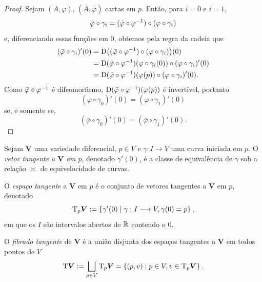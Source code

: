 \begin{proof}
Sejam $(A,\varphi)$, $(\bar A,\bar \varphi)$ cartas em $p$. Então, para $i=0$ e $i=1$,
	\begin{equation*}
	\bar\varphi \circ \gamma_i = (\bar\varphi \circ \varphi^{-1}) \circ (\varphi \circ \gamma_i)
	\end{equation*}
e, diferenciando essas funções em $0$, obtemos pela regra da cadeia que
	\begin{align*}
	(\bar\varphi \circ \gamma_i)'(0) &= \mathrm{D} \big( (\bar\varphi \circ \varphi^{-1}) \circ (\varphi \circ \gamma_i) \big)(0) \\
	&= \mathrm{D}(\bar\varphi \circ \varphi^{-1})(\varphi \circ \gamma_i(0)) \circ (\varphi \circ \gamma_i)'(0) \\
	&=  \mathrm{D}(\bar\varphi \circ \varphi^{-1})(\varphi(p)) \circ (\varphi \circ \gamma_i)'(0).
	\end{align*}
Como $\bar\varphi \circ \varphi^{-1}$ é difeomorfismo, $\mathrm{D}(\bar\varphi \circ \varphi^{-1})(\varphi(p))$ é invertível, portanto
	\begin{equation*}
	(\varphi \circ \gamma_0)'(0) = (\varphi \circ \gamma_1)'(0)
	\end{equation*}
se, e somente se,
	\begin{equation*}
	(\bar\varphi \circ \gamma_0)'(0) = (\bar\varphi \circ \gamma_1)'(0).
	\end{equation*}
\end{proof}

\begin{defi}
Sejam $\bm V$ uma variedade diferencial, $p \in V$ e $\gamma: I \to V$ uma curva iniciada em $p$. O \emph{vetor tangente a $\bm V$ em $p$}, denotado $\gamma'(0)$, é a classe de equivalência de $\gamma$ sob a relação $\asymp$ de equivelocidade de curvas.

O \emph{espaço tangente} a $\bm V$ em $p$ é o conjunto de vetores tangentes a $\bm V$ em $p$, denotado
	\begin{equation*}
	\mathrm{T}_p\bm V := \left\{\gamma'(0) \;\middle\vert\; \gamma: I \longrightarrow V, \gamma(0)=p \right\},
	\end{equation*}
em que os $I$ são intervalos abertos de $\mathbb{R}$ contendo o $0$.

O \emph{fibrado tangente} de $\bm V$ é a união disjunta dos espaços tangentes a $\bm V$ em todos pontos de $V$
	\begin{equation*}
	\mathrm{T}\bm V := \bigsqcup_{p  \in V} \mathrm{T}_p\bm V = \left\{(p,v) \;\middle\vert\; p \in V,v \in \mathrm{T}_p\bm V \right\}.
	\end{equation*}
\end{defi}


